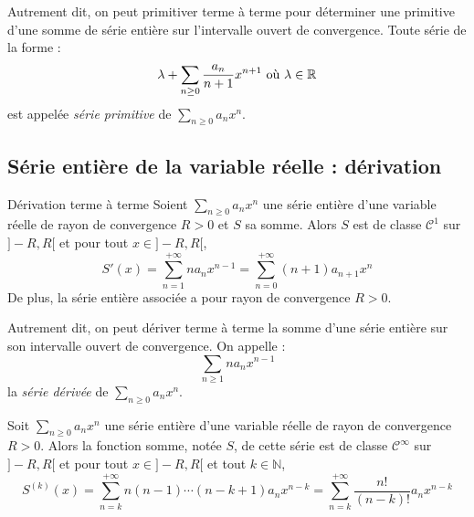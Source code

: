 \documentclass[french,11pt,twoside]{VcCours}
\begin{document}
Autrement dit, on peut \og{} primitiver \fg{} terme à terme pour déterminer une primitive d'une somme de série entière sur l'intervalle ouvert de convergence. Toute série de la forme :
$$ \lambda + \sum_{n\geq 0}  \dfrac{a_n}{n+1} x^{n+1} \hbox{ où } \lambda \in \mathbb{R}$$
est appelée \emph{série primitive} de $\sum_{n \geq 0} a_n x^n$.

\begin{Demonstration}{}

\vspace{7cm}
\end{Demonstration}

\newpage

\phantom{test}

\vspace{4cm}

\subsection{Série entière de la variable réelle : dérivation}

\begin{Theoreme}{Dérivation terme à terme}
Soient $\sum_{n \geq 0} a_n x^n$ une série entière d'une variable réelle de rayon de convergence $R>0$ et $S$ sa somme. Alors $S$ est de classe $\mathcal{C}^1$ sur $]-R,R[$ et pour tout $x \in ]-R,R[$,
$$S'(x) = \sum_{n=1}^{+ \infty} n a_n x^{n-1} = \sum_{n=0}^{+ \infty} (n+1) a_{n+1} x^n$$
De plus, la série entière associée a pour rayon de convergence $R>0$.
\end{Theoreme}

Autrement dit, on peut dériver terme à terme la somme d'une série entière sur son intervalle ouvert de convergence. On appelle :
$$ \sum_{n \geq 1} n a_n x^{n-1}$$
la \emph{série dérivée} de $\sum_{n \geq 0} a_n x^n$.

\begin{Demonstration}{}
\vspace{6cm}
\end{Demonstration}
%
%
%
\begin{Theoreme}{} Soit $\sum_{n \geq 0} a_n x^n$ une série entière d'une variable réelle de rayon de convergence $R>0$. Alors la fonction somme, notée $S$, de cette série est de classe $\mathcal{C}^{\infty}$ sur $]-R,R[$ et pour tout $x \in ]-R,R[$ et tout $k \in \mathbb{N}$,
$$S^{(k)}(x) = \sum_{n=k}^{+ \infty} n(n-1)\cdots(n-k+1) a_n x^{n-k} = \sum_{n=k}^{+ \infty} \frac{n!}{(n-k)!} a_n x^{n-k}$$
\end{Theoreme}
\end{document}
